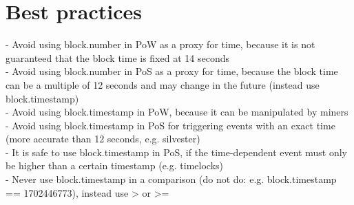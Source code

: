\section{Best practices}
- Avoid using block.number in PoW as a proxy for time, because it is not guaranteed that the block time is fixed at 14 seconds \\
- Avoid using block.number in PoS as a proxy for time, because the block time can be a multiple of 12 seconds and may change in the future (instead use block.timestamp)\\
- Avoid using block.timestamp in PoW, because it can be manipulated by miners \\
- Avoid using block.timestamp in PoS for triggering events with an exact time (more accurate than 12 seconds, e.g. silvester) \\
- It is safe to use block.timestamp in PoS, if the time-dependent event must only be higher than a certain timestamp (e.g. timelocks) \\
- Never use block.timestamp in a comparison (do not do: e.g. block.timestamp == 1702446773), instead use > or >=
